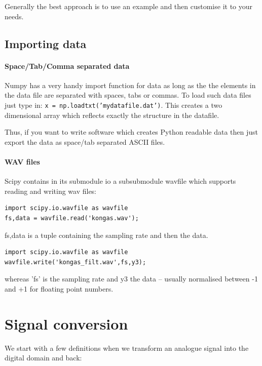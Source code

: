 \documentclass[12pt,a4paper]{article}
\begin{document}
Generally the best approach is to use an example and then customise it to your needs.




\subsection{Importing data}

\paragraph{Space/Tab/Comma separated data}
Numpy has a very handy import function for data as long as the the
elements in the data file are separated with spaces, tabs or
commas. To load such data files just type in: \texttt{x =
  np.loadtxt('mydatafile.dat')}. This creates a two dimensional array
which reflects exactly the structure in the datafile.

Thus, if you want to write software which creates Python
readable data then just export the data as space/tab separated ASCII files.



\paragraph{WAV files}
Scipy contains in its submodule io a subsubmodule wavfile which supports
reading and writing wav files:
\begin{verbatim}
import scipy.io.wavfile as wavfile
fs,data = wavfile.read('kongas.wav');
\end{verbatim}
fs,data is a tuple containing the sampling rate and then the data.

\begin{verbatim}
import scipy.io.wavfile as wavfile
wavfile.write('kongas_filt.wav',fs,y3);
\end{verbatim}
whereas 'fs' is the sampling rate and y3 the data -- usually normalised between
-1 and +1 for floating point numbers.


\clearpage


\section{Signal conversion}

We start with a few definitions when we transform an analogue signal into the digital
domain and back:
\end{document}

